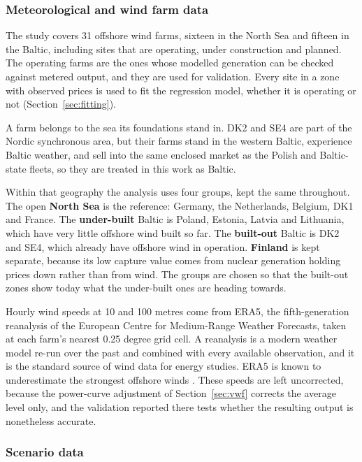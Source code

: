 \subsubsection{Meteorological and wind farm data}\label{sec:farm_data}

The study covers 31 offshore wind farms, sixteen in the North Sea and fifteen in
the Baltic, including sites that are operating, under construction and planned.
The operating farms are the ones whose modelled generation can be checked
against metered output, and they are used for validation. Every site in a zone
with observed prices is used to fit the regression model, whether it is
operating or not (Section~\ref{sec:fitting}).

A farm belongs to the sea its foundations stand in. DK2 and SE4 are part of the
Nordic synchronous area, but their farms stand in the western Baltic, experience
Baltic weather, and sell into the same enclosed market as the Polish and
Baltic-state fleets, so they are treated in this work as Baltic.

Within that geography the analysis uses four groups, kept the same throughout.
The open \textbf{North Sea} is the reference: Germany, the Netherlands, Belgium,
DK1 and France. The \textbf{under-built} Baltic is Poland, Estonia, Latvia and
Lithuania, which have very little offshore wind built so far. The
\textbf{built-out} Baltic is DK2 and SE4, which already have offshore wind in
operation. \textbf{Finland} is kept separate, because its low capture value
comes from nuclear generation holding prices down rather than from wind. The
groups are chosen so that the built-out zones show today what the under-built
ones are heading towards.

Hourly wind speeds at 10 and 100 metres come from ERA5, the fifth-generation
reanalysis of the European Centre for Medium-Range Weather Forecasts, taken at
each farm's nearest 0.25 degree grid cell. A reanalysis is a modern weather
model re-run over the past and combined with every available observation, and it
is the standard source of wind data for energy studies. ERA5 is known to
underestimate the strongest offshore winds \cite{Gandoin2024}. These speeds are left uncorrected, because the power-curve adjustment of
Section~\ref{sec:vwf} corrects the average level only, and the validation
reported there tests whether the resulting output is nonetheless accurate.

\subsubsection{Scenario data}\label{sec:scenario_data}

